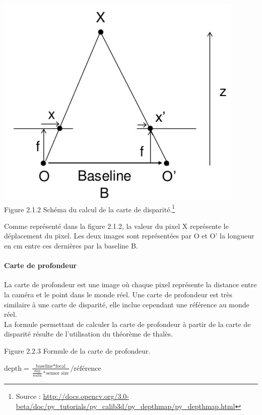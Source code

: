 \documentclass[12pt,a4paper]{report}
\begin{document}
\begin{center}
	\includegraphics[scale=0.5]{disparity.jpg}\\
	Figure 2.1.2 Schéma du calcul de la carte de disparité.\footnote{Source : \url{http://docs.opencv.org/3.0-beta/doc/py_tutorials/py_calib3d/py_depthmap/py_depthmap.html}}\\
\end{center}

Comme représenté dans la figure 2.1.2, la valeur du pixel X représente le déplacement du pixel.
Les deux images sont représentées par O et O' la longueur en cm entre ces dernières par la baseline B.
\paragraph{Carte de profondeur}
La carte de profondeur est une image où chaque pixel représente la distance entre la caméra et le point dans le monde réel. Une carte de profondeur est très similaire à une carte de disparité, elle inclue cependant une référence au monde réel.\\
La formule permettant de calculer la carte de profondeur à partir de la carte de disparité résulte de l'utilisation du théorème de thalès.\\

\begin{center}
Figure 2.2.3 Formule de la carte de profondeur.\\

\begin{huge}
$\text{depth} = \frac{\text{baseline} * \text{focal}}{\frac{\text{disp}}{\text{width}} * \text{sensor size}} / \text{référence}$\\
\end{huge}
\end{center}
\end{document}
